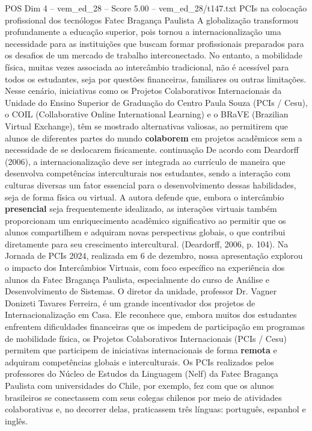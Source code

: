 \begin{textsample}{POS Dim 4 – vem\_ed\_28 – Score 5.00 – vem\_ed\_28/t147.txt}  \label{ex:f4_pos_042}
PCIs na colocação profissional dos tecnólogos Fatec Bragança Paulista A globalização transformou profundamente a educação superior, pois tornou a internacionalização uma necessidade para as instituições que buscam formar profissionais preparados para os desafios de um mercado de trabalho interconectado.
No entanto, a mobilidade física, muitas vezes associada ao intercâmbio tradicional, não é acessível para todos os estudantes, seja por questões financeiras, familiares ou outras limitações.
Nesse cenário, iniciativas como os Projetos Colaborativos Internacionais da Unidade do Ensino Superior de Graduação do Centro Paula Souza (PCIs / Cesu), o COIL (Collaborative Online International Learning) e o BRaVE (Brazilian Virtual Exchange), têm se mostrado alternativas valiosas, ao permitirem que alunos de diferentes partes do mundo \textbf{colaborem} em projetos acadêmicos sem a necessidade de se deslocarem fisicamente. continuação De acordo com Deardorff (2006), a internacionalização deve ser integrada ao currículo de maneira que desenvolva competências interculturais nos estudantes, sendo a interação com culturas diversas um fator essencial para o desenvolvimento dessas habilidades, seja de forma física ou virtual.
A autora defende que, embora o intercâmbio \textbf{presencial} seja frequentemente idealizado, as interações virtuais também proporcionam um enriquecimento acadêmico significativo ao permitir que os alunos compartilhem e adquiram novas perspectivas globais, o que contribui diretamente para seu crescimento intercultural. (Deardorff, 2006, p. 104).
Na Jornada de PCIs 2024, realizada em 6 de dezembro, nossa apresentação explorou o impacto dos Intercâmbios Virtuais, com foco específico na experiência dos alunos da Fatec Bragança Paulista, especialmente do curso de Análise e Desenvolvimento de Sistemas.
O diretor da unidade, professor Dr.
Vagner Donizeti Tavares Ferreira, é um grande incentivador dos projetos de Internacionalização em Casa.
Ele reconhece que, embora muitos dos estudantes enfrentem dificuldades financeiras que os impedem de participação em programas de mobilidade física, os Projetos Colaborativos Internacionais (PCIs / Cesu) permitem que participem de iniciativas internacionais de forma \textbf{remota} e adquiram competências globais e interculturais.
Os PCIs realizados pelos professores do Núcleo de Estudos da Linguagem (Nelf) da Fatec Bragança Paulista com universidades do Chile, por exemplo, fez com que os alunos brasileiros se conectassem com seus colegas chilenos por meio de atividades colaborativas e, no decorrer delas, praticassem três línguas: português, espanhol e inglês.

\end{textsample}
